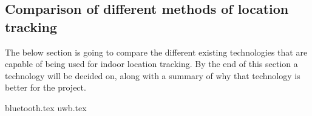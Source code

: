 \subsection{Comparison of different methods of location tracking}
The below section is going to compare the different existing technologies that are capable of being used for indoor location tracking. By the end of this section a technology will be decided on, along with a summary of why that technology is better for the project.

{bluetooth.tex}
{uwb.tex}
